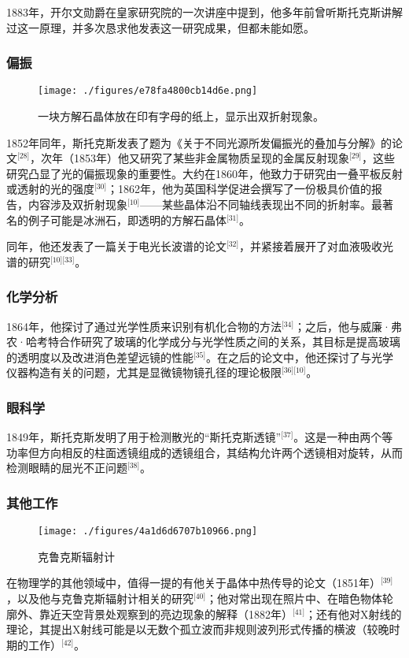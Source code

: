 1883年，开尔文勋爵在皇家研究院的一次讲座中提到，他多年前曾听斯托克斯讲解过这一原理，并多次恳求他发表这一研究成果，但都未能如愿。
\subsubsection{偏振}
\begin{figure}[ht]
\centering
\texttt{[image: ./figures/e78fa4800cb14d6e.png]}
\caption{一块方解石晶体放在印有字母的纸上，显示出双折射现象。} \label{fig_QZstks_4}
\end{figure}
1852年同年，斯托克斯发表了题为《关于不同光源所发偏振光的叠加与分解》的论文\(^\text{[28]}\)，次年（1853年）他又研究了某些非金属物质呈现的金属反射现象\(^\text{[29]}\)，这些研究凸显了光的偏振现象的重要性。大约在1860年，他致力于研究由一叠平板反射或透射的光的强度\(^\text{[30]}\)；1862年，他为英国科学促进会撰写了一份极具价值的报告，内容涉及双折射现象\(^\text{[10]}\)——某些晶体沿不同轴线表现出不同的折射率。最著名的例子可能是冰洲石，即透明的方解石晶体\(^\text{[31]}\)。

同年，他还发表了一篇关于电光长波谱的论文\(^\text{[32]}\)，并紧接着展开了对血液吸收光谱的研究\(^\text{[10][33]}\)。
\subsubsection{化学分析}
1864年，他探讨了通过光学性质来识别有机化合物的方法\(^\text{[34]}\)；之后，他与威廉·弗农·哈考特合作研究了玻璃的化学成分与光学性质之间的关系，其目标是提高玻璃的透明度以及改进消色差望远镜的性能\(^\text{[35]}\)。在之后的论文中，他还探讨了与光学仪器构造有关的问题，尤其是显微镜物镜孔径的理论极限\(^\text{[36][10]}\)。
\subsubsection{眼科学}
1849年，斯托克斯发明了用于检测散光的“斯托克斯透镜”\(^\text{[37]}\)。这是一种由两个等功率但方向相反的柱面透镜组成的透镜组合，其结构允许两个透镜相对旋转，从而检测眼睛的屈光不正问题\(^\text{[38]}\)。
\subsubsection{其他工作}
\begin{figure}[ht]
\centering
\texttt{[image: ./figures/4a1d6d6707b10966.png]}
\caption{克鲁克斯辐射计} \label{fig_QZstks_5}
\end{figure}
在物理学的其他领域中，值得一提的有他关于晶体中热传导的论文（1851年）\(^\text{[39]}\)，以及他与克鲁克斯辐射计相关的研究\(^\text{[40]}\)；他对常出现在照片中、在暗色物体轮廓外、靠近天空背景处观察到的亮边现象的解释（1882年）\(^\text{[41]}\)；还有他对X射线的理论，其提出X射线可能是以无数个孤立波而非规则波列形式传播的横波（较晚时期的工作）\(^\text{[42]}\)。

